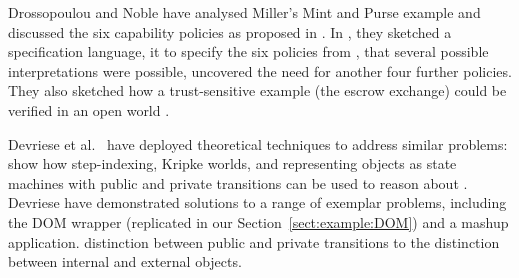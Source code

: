 Dro\-sso\-pou\-lou and Noble \cite{capeFTfJP,capeFTfJP14} have
analysed Miller's Mint and Purse example \cite{MillerPhD} 
and discussed the six
capability policies 
as proposed in \cite{MillerPhD}.
In %
\cite{WAS-OOPSLA14-TR}, {they} %
sketched a  specification language,    it to  
specify the six policies from \cite{MillerPhD}, %
 that several possible interpretations were possible, %
 uncovered
the need for another four further policies.
They also
  sketched how 
a trust-sensitive 
example (the escrow exchange) could be verified in an open world
\cite{swapsies}. 
 
Devriese et al.\ \cite{dd}  have deployed
  theoretical techniques to address similar problems:  %
   show how step-indexing, Kripke worlds, and representing objects
as state machines with public and private transitions can be used to
reason about %
.
Devriese have demonstrated solutions to a range of exemplar problems,
including the DOM wrapper (replicated in our
Section~\ref{sect:example:DOM}) and a mashup application.
 distinction
between public and private transitions %
 to the
distinction between internal and external objects.

